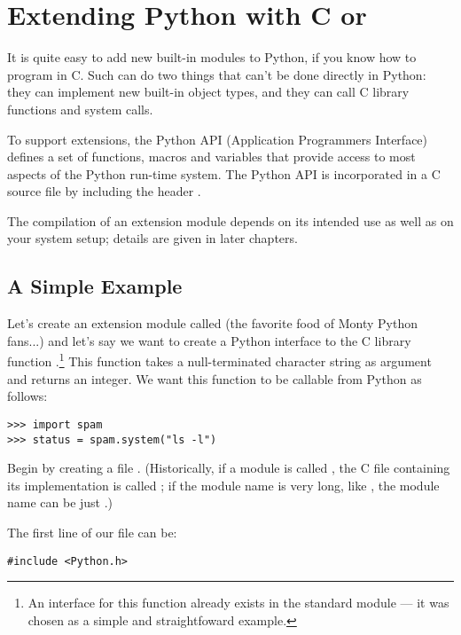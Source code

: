 \chapter{Extending Python with C or \Cpp \label{intro}}


It is quite easy to add new built-in modules to Python, if you know
how to program in C.  Such  can do two things
that can't be done directly in Python: they can implement new built-in
object types, and they can call C library functions and system calls.

To support extensions, the Python API (Application Programmers
Interface) defines a set of functions, macros and variables that
provide access to most aspects of the Python run-time system.  The
Python API is incorporated in a C source file by including the header
.

The compilation of an extension module depends on its intended use as
well as on your system setup; details are given in later chapters.


\section{A Simple Example
         \label{simpleExample}}

Let's create an extension module called  (the favorite food
of Monty Python fans...) and let's say we want to create a Python
interface to the C library function .\footnote{An
interface for this function already exists in the standard module
 --- it was chosen as a simple and straightfoward example.}
This function takes a null-terminated character string as argument and
returns an integer.  We want this function to be callable from Python
as follows:

\begin{verbatim}
>>> import spam
>>> status = spam.system("ls -l")
\end{verbatim}

Begin by creating a file .  (Historically, if a
module is called , the C file containing its implementation
is called ; if the module name is very long, like
, the module name can be just .)

The first line of our file can be:

\begin{verbatim}
#include <Python.h>
\end{verbatim}

